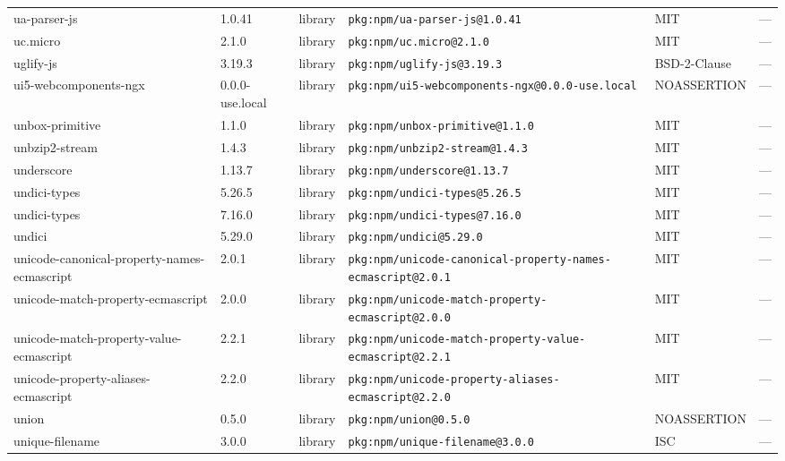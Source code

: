 \documentclass[11pt,a4paper]{article}
\begin{document}
\begin{longtable}{|p{4cm}|p{2cm}|p{1.6cm}|p{5cm}|p{1.5cm}|p{3.5cm}|}
\raggedright ua-parser-js & 1.0.41 & library & \small\texttt{pkg:npm/ua-parser-js@1.0.41} & MIT & \small — \\
\raggedright uc.micro & 2.1.0 & library & \small\texttt{pkg:npm/uc.micro@2.1.0} & MIT & \small — \\
\raggedright uglify-js & 3.19.3 & library & \small\texttt{pkg:npm/uglify-js@3.19.3} & BSD-2-Clause & \small — \\
\raggedright ui5-webcomponents-ngx & 0.0.0-use.local & library & \small\texttt{pkg:npm/ui5-webcomponents-ngx@0.0.0-use.local} & NOASSERTION & \small — \\
\raggedright unbox-primitive & 1.1.0 & library & \small\texttt{pkg:npm/unbox-primitive@1.1.0} & MIT & \small — \\
\raggedright unbzip2-stream & 1.4.3 & library & \small\texttt{pkg:npm/unbzip2-stream@1.4.3} & MIT & \small — \\
\raggedright underscore & 1.13.7 & library & \small\texttt{pkg:npm/underscore@1.13.7} & MIT & \small — \\
\raggedright undici-types & 5.26.5 & library & \small\texttt{pkg:npm/undici-types@5.26.5} & MIT & \small — \\
\raggedright undici-types & 7.16.0 & library & \small\texttt{pkg:npm/undici-types@7.16.0} & MIT & \small — \\
\raggedright undici & 5.29.0 & library & \small\texttt{pkg:npm/undici@5.29.0} & MIT & \small — \\
\raggedright unicode-canonical-property-names-ecmascript & 2.0.1 & library & \small\texttt{pkg:npm/unicode-canonical-property-names-ecmascript@2.0.1} & MIT & \small — \\
\raggedright unicode-match-property-ecmascript & 2.0.0 & library & \small\texttt{pkg:npm/unicode-match-property-ecmascript@2.0.0} & MIT & \small — \\
\raggedright unicode-match-property-value-ecmascript & 2.2.1 & library & \small\texttt{pkg:npm/unicode-match-property-value-ecmascript@2.2.1} & MIT & \small — \\
\raggedright unicode-property-aliases-ecmascript & 2.2.0 & library & \small\texttt{pkg:npm/unicode-property-aliases-ecmascript@2.2.0} & MIT & \small — \\
\raggedright union & 0.5.0 & library & \small\texttt{pkg:npm/union@0.5.0} & NOASSERTION & \small — \\
\raggedright unique-filename & 3.0.0 & library & \small\texttt{pkg:npm/unique-filename@3.0.0} & ISC & \small — \\

\end{longtable}
\end{document}

